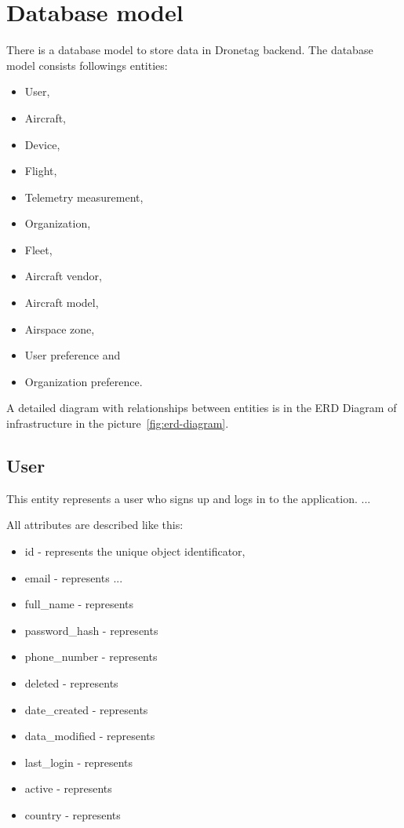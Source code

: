 \section{Database model}\label{sec:database-model}
There is a database model to store data in Dronetag backend.
The database model consists followings entities:
\begin{itemize}
    \item User,
    \item Aircraft,
    \item Device,
    \item Flight,
    \item Telemetry measurement,
    \item Organization,
    \item Fleet,
    \item Aircraft vendor,
    \item Aircraft model,
    \item Airspace zone,
    \item User preference and
    \item Organization preference.
\end{itemize}
A detailed diagram with relationships between entities is in the ERD Diagram of infrastructure in the picture~\ref{fig:erd-diagram}.

\subsection{User}\label{subsec:user}
This entity represents a user who signs up and logs in to the application.
...

All attributes are described like this:
\begin{itemize}
    \item id - represents the unique object identificator,
    \item email - represents ...
    \item full\_name - represents
    \item password\_hash - represents
    \item phone\_number - represents
    \item deleted - represents
    \item date\_created - represents
    \item data\_modified - represents
    \item last\_login - represents
    \item active - represents
    \item country - represents
\end{itemize}

